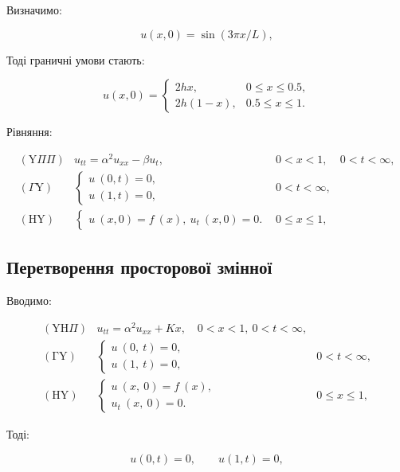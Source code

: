 \documentclass[
  ukrainian,
]{article}
\begin{document}
Визначимо:

\[
u(x, 0) = \sin(3\pi x/L),
\]

Тоді граничні умови стають:

\[
u(x, 0) = \begin{cases} 2hx, & 0 \le x \le 0.5, \\ 2h(1-x), & 0.5 \le x \le 1. \end{cases}
\]

Рівняння:

\[
\begin{array}{llll} (\mathrm{Y} \Pi \Pi) & u_{tt} = \alpha^2 u_{xx} - \beta u_t, & 0 < x < 1, & 0 <t < \infty, \\ (\Gamma \mathrm{Y}) & \begin{cases} u \ (0, t) = 0, \\ u \ (1, t) = 0, \end{cases} & 0 < t < \infty, \\ (\mathrm{H} \mathrm{Y}) & \begin{cases} u \ (x, 0) = f \ (x), \ u_t \ (x, 0) = 0. \end{cases} & 0 \leqslant x \leqslant 1, \end{array}
\]

\subsection{Перетворення просторової
змінної}\label{ux43fux435ux440ux435ux442ux432ux43eux440ux435ux43dux43dux44f-ux43fux440ux43eux441ux442ux43eux440ux43eux432ux43eux457-ux437ux43cux456ux43dux43dux43eux457}

Вводимо:

\[
\begin{array}{llll} (\mathrm{Y} \mathrm{H} \Pi) & u_{tt} = \alpha^2 u_{xx} + Kx, \quad 0 < x < 1, \ 0 < t < \infty, \\ (\mathrm{\Gamma} \mathrm{Y}) & \begin{cases} u \ (0, \ t) = 0, \\ u \ (1, \ t) = 0, \end{cases} & 0 < t < \infty, \\ (\mathrm{H} \mathrm{Y}) & \begin{cases} u \ (x, \ 0) = f \ (x), \\ u_t \ (x, \ 0) = 0. \end{cases} & 0 \leqslant x \leqslant 1, \end{array}
\]

Тоді:

\[
u(0, t) = 0, \qquad u(1, t) = 0,
\]
\end{document}
